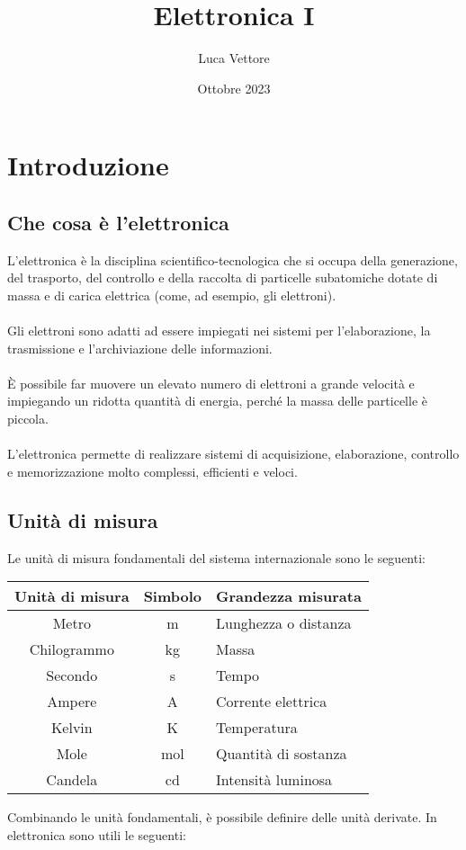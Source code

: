 \documentclass{article}
\title{Elettronica I}
\author{Luca Vettore}
\date{Ottobre 2023}
\begin{document}


\maketitle

\section{Introduzione}

\subsection{Che cosa è l'elettronica}
L’elettronica è la disciplina scientifico-tecnologica che si occupa della
generazione, del trasporto, del controllo e della raccolta di particelle
subatomiche dotate di massa e di carica elettrica (come, ad esempio, gli
elettroni).\\\\
Gli elettroni sono adatti ad essere impiegati nei sistemi per l’elaborazione, la
trasmissione e l’archiviazione delle informazioni.\\\\
È possibile far muovere un elevato numero di elettroni a grande velocità e
impiegando un ridotta quantità di energia, perché la massa delle particelle è
piccola.\\\\
L’elettronica permette di realizzare sistemi di acquisizione, elaborazione, controllo
e memorizzazione molto complessi, efficienti e veloci.

\subsection{Unità di misura}
Le unità di misura fondamentali del sistema internazionale sono le seguenti:

\begin{center}
\begin{tabular}{|c|c|p{6cm}|}
\hline
\textbf{Unità di misura} & \textbf{Simbolo} & \textbf{Grandezza misurata} \\
\hline
Metro & m & Lunghezza o distanza \\
Chilogrammo & kg & Massa \\
Secondo & s & Tempo \\
Ampere & A & Corrente elettrica \\
Kelvin & K & Temperatura \\
Mole & mol & Quantità di sostanza \\
Candela & cd & Intensità luminosa \\
\hline
\end{tabular}
\end{center}
Combinando le unità fondamentali, è possibile definire delle unità derivate. In elettronica sono utili le seguenti:
\end{document}
